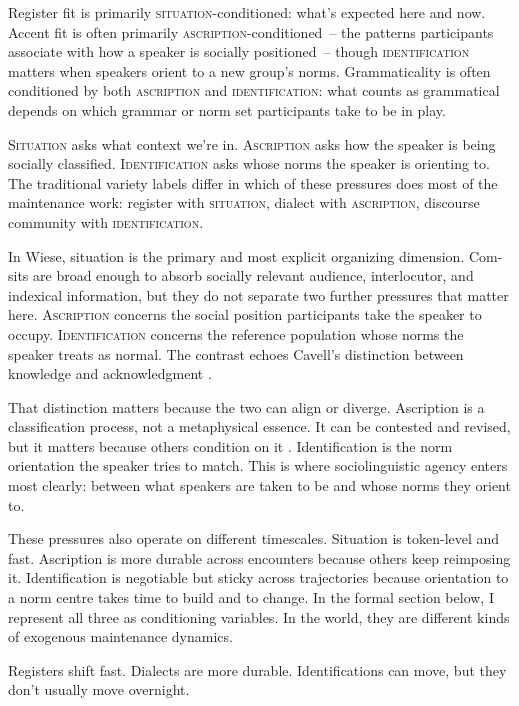 \documentclass[11pt,letterpaper]{article}
\begin{document}
Register fit is primarily \textsc{situation}-conditioned: what's expected here and now. Accent fit is often primarily \textsc{ascription}-conditioned~-- the patterns participants associate with how a speaker is socially positioned~-- though \textsc{identification} matters when speakers orient to a new group's norms. Grammaticality is often conditioned by both \textsc{ascription} and \textsc{identification}: what counts as grammatical depends on which grammar or norm set participants take to be in play.

\textsc{Situation} asks what context we're in. \textsc{Ascription} asks how the speaker is being socially classified. \textsc{Identification} asks whose norms the speaker is orienting to. The traditional variety labels differ in which of these pressures does most of the maintenance work: register with \textsc{situation}, dialect with \textsc{ascription}, discourse community with \textsc{identification}.

In Wiese, situation is the primary and most explicit organizing dimension. Com-sits are broad enough to absorb socially relevant audience, interlocutor, and indexical information, but they do not separate two further pressures that matter here. \textsc{Ascription} concerns the social position participants take the speaker to occupy. \textsc{Identification} concerns the reference population whose norms the speaker treats as normal. The contrast echoes Cavell's distinction between knowledge and acknowledgment \citep{cavell1979claim}.

That distinction matters because the two can align or diverge. Ascription is a classification process, not a metaphysical essence. It can be contested and revised, but it matters because others condition on it \citep[52]{drummond_schleef2016_identity}. Identification is the norm orientation the speaker tries to match. This is where sociolinguistic agency enters most clearly: between what speakers are taken to be and whose norms they orient to.

These pressures also operate on different timescales. Situation is token-level and fast. Ascription is more durable across encounters because others keep reimposing it. Identification is negotiable but sticky across trajectories because orientation to a norm centre takes time to build and to change. In the formal section below, I represent all three as conditioning variables. In the world, they are different kinds of exogenous maintenance dynamics.

Registers shift fast. Dialects are more durable. Identifications can move, but they don't usually move overnight.
\end{document}
